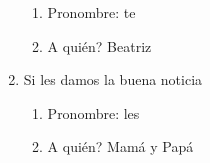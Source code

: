 \documentclass[12pt]{article}
\begin{document}
\begin{enumerate}
\begin{enumerate}
      \item Pronombre: te

      \item A qui\'en? Beatriz

    \end{enumerate}

  \item Si les damos la buena noticia

    \begin{enumerate}

      \item Pronombre: les

      \item A qui\'en? Mam\'a y Pap\'a

    \end{enumerate}

\end{enumerate}
\end{document}
